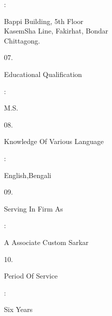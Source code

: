 \documentclass[12pt]{article}
\begin{document}
\begin{minipage}[t]{0.02\linewidth}
:
\end{minipage}
\begin{minipage}[t]{0.38\linewidth}
Bappi Building, 5th Floor
\\
KasemSha Line, Fakirhat, Bondar
\\
Chittagong.
\end{minipage}
\begin{minipage}[t]{0.05\linewidth}
07.
\end{minipage}
\begin{minipage}[t]{0.55\linewidth}
Educational Qualification
\end{minipage}
\begin{minipage}[t]{0.02\linewidth}
:
\end{minipage}
\begin{minipage}[t]{0.38\linewidth}
M.S.
\end{minipage}
\begin{minipage}[t]{0.05\linewidth}
08.
\end{minipage}
\begin{minipage}[t]{0.55\linewidth}
Knowledge Of Various Language
\end{minipage}
\begin{minipage}[t]{0.02\linewidth}
:
\end{minipage}
\begin{minipage}[t]{0.38\linewidth}
English,Bengali
\end{minipage}
\begin{minipage}[t]{0.05\linewidth}
09.
\end{minipage}
\begin{minipage}[t]{0.55\linewidth}
Serving  In Firm  As
\end{minipage}
\begin{minipage}[t]{0.02\linewidth}
:
\end{minipage}
\begin{minipage}[t]{0.38\linewidth}
A Associate Custom Sarkar
\end{minipage}
\begin{minipage}[t]{0.05\linewidth}
10.
\end{minipage}
\begin{minipage}[t]{0.55\linewidth}
Period Of Service
\end{minipage}
\begin{minipage}[t]{0.02\linewidth}
:
\end{minipage}
\begin{minipage}[t]{0.38\linewidth}
Six Years
\end{minipage}
\end{document}
